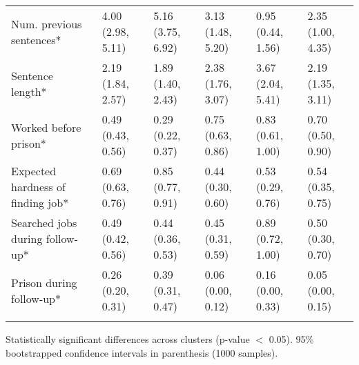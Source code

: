 \begin{table}[htp]
\begin{threeparttable}
\begin{tabular}{llllll}
  \quad Num. previous sentences* & 4.00 (2.98, 5.11) & 5.16 (3.75, 6.92) & 3.13 (1.48, 5.20) & 0.95 (0.44, 1.56) & 2.35 (1.00, 4.35) \\ 
  \quad Sentence length* & 2.19 (1.84, 2.57) & 1.89 (1.40, 2.43) & 2.38 (1.76, 3.07) & 3.67 (2.04, 5.41) & 2.19 (1.35, 3.11) \\ 
  \quad Worked before prison* & 0.49 (0.43, 0.56) & 0.29 (0.22, 0.37) & 0.75 (0.63, 0.86) & 0.83 (0.61, 1.00) & 0.70 (0.50, 0.90) \\ 
  \quad Expected hardness of finding job* & 0.69 (0.63, 0.76) & 0.85 (0.77, 0.91) & 0.44 (0.30, 0.60) & 0.53 (0.29, 0.76) & 0.54 (0.35, 0.75) \\ 
  \quad Searched jobs during follow-up* & 0.49 (0.42, 0.56) & 0.44 (0.36, 0.53) & 0.45 (0.31, 0.59) & 0.89 (0.72, 1.00) & 0.50 (0.30, 0.70) \\ 
  \quad Prison during follow-up* & 0.26 (0.20, 0.31) & 0.39 (0.31, 0.47) & 0.06 (0.00, 0.12) & 0.16 (0.00, 0.33) & 0.05 (0.00, 0.15) \\ 
  \addlinespace
\addlinespace
\addlinespace
\hline
\addlinespace
\end{tabular}
\begin{tablenotes}
\scriptsize
    \item * Statistically significant differences across clusters (p-value $<$ 0.05). 95\% bootstrapped confidence intervals in parenthesis (1000 samples).
\end{tablenotes}
\end{threeparttable}
\end{table}
